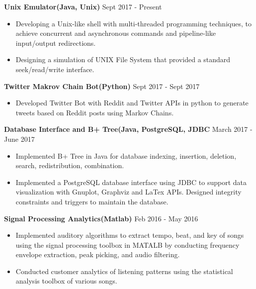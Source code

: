 \documentclass{article}
\begin{document}
\noindent
\textbf{Unix Emulator(Java, Unix)}
\hfill Sept 2017 - Present 
\begin{itemize}[leftmargin=*]
\vspace{-2.5mm}
\item Developing a Unix-like shell with multi-threaded programming techniques, to achieve concurrent and asynchronous commands and pipeline-like input/output redirections.
\vspace{-2.5mm}
\item Designing a simulation of UNIX File System that provided a standard
seek/read/write interface.
\end{itemize}
\vspace{-2.0mm}


\noindent
\textbf{Twitter Makrov Chain Bot(Python)}
\hfill Sept 2017 - Sept 2017
\begin{itemize}[leftmargin=*]
\vspace{-2.5mm}
\item Developed Twitter Bot with Reddit and Twitter APIs in python to generate tweets based on Reddit posts using Markov Chains.
\end{itemize}
\vspace{-2.0mm}

\noindent
\textbf{Database Interface and B+ Tree(Java, PostgreSQL, JDBC}
\hfill March 2017 - June 2017 
\begin{itemize}[leftmargin=*]
\vspace{-2.5mm}
\item Implemented B+ Tree in Java for database indexing, insertion, deletion, search,
redistribution, combination.
\vspace{-2.5mm}
\item Implemented a PostgreSQL database interface using JDBC to support data visualization with Gnuplot, Graphviz and LaTex APIs. Designed integrity constraints and triggers to maintain the database.
\end{itemize}
\vspace{-2.0mm}



\noindent
\textbf{Signal Processing Analytics(Matlab)}
\hfill Feb 2016 - May 2016
\begin{itemize}[leftmargin=*]
\vspace{-2.5mm}
\item Implemented auditory algorithms to extract tempo, beat, and key of songs using the signal processing toolbox in MATALB by conducting frequency envelope extraction, peak picking, and audio filtering.
\vspace{-2.5mm}
\item Conducted customer analytics of listening patterns using the statistical analysis toolbox of various songs.
\end{itemize}
\end{document}
